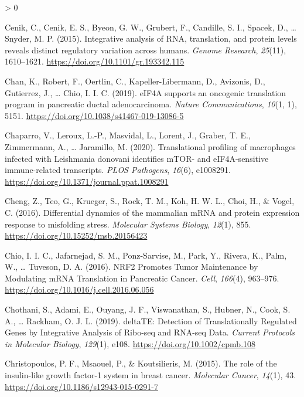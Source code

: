 \documentclass[
  12pt,
  openany]{book}
\newlength{\cslhangindent}
\newenvironment{CSLReferences}[2] %
 {%
  \setlength{\parindent}{0pt}
  \ifodd #1 \everypar{\setlength{\hangindent}{\cslhangindent}}\ignorespaces\fi
  \ifnum #2 > 0
  \setlength{\parskip}{#2\baselineskip}
  \fi
 }%
 {}
\begin{document}
\begin{CSLReferences}{1}{0}
\leavevmode\hypertarget{ref-Cenik2015}{}%
Cenik, C., Cenik, E. S., Byeon, G. W., Grubert, F., Candille, S. I., Spacek, D., \ldots{} Snyder, M. P. (2015). Integrative analysis of {RNA}, translation, and protein levels reveals distinct regulatory variation across humans. \emph{Genome Research}, \emph{25}(11), 1610--1621. \url{https://doi.org/10.1101/gr.193342.115}

\leavevmode\hypertarget{ref-Chan2019}{}%
Chan, K., Robert, F., Oertlin, C., Kapeller-Libermann, D., Avizonis, D., Gutierrez, J., \ldots{} Chio, I. I. C. (2019). {eIF4A} supports an oncogenic translation program in pancreatic ductal adenocarcinoma. \emph{Nature Communications}, \emph{10}(1, 1), 5151. \url{https://doi.org/10.1038/s41467-019-13086-5}

\leavevmode\hypertarget{ref-Chaparro2020}{}%
Chaparro, V., Leroux, L.-P., Masvidal, L., Lorent, J., Graber, T. E., Zimmermann, A., \ldots{} Jaramillo, M. (2020). Translational profiling of macrophages infected with {Leishmania} donovani identifies {mTOR}- and {eIF4A}-sensitive immune-related transcripts. \emph{PLOS Pathogens}, \emph{16}(6), e1008291. \url{https://doi.org/10.1371/journal.ppat.1008291}

\leavevmode\hypertarget{ref-Cheng2016}{}%
Cheng, Z., Teo, G., Krueger, S., Rock, T. M., Koh, H. W. L., Choi, H., \& Vogel, C. (2016). Differential dynamics of the mammalian {mRNA} and protein expression response to misfolding stress. \emph{Molecular Systems Biology}, \emph{12}(1), 855. \url{https://doi.org/10.15252/msb.20156423}

\leavevmode\hypertarget{ref-Chio2016}{}%
Chio, I. I. C., Jafarnejad, S. M., Ponz-Sarvise, M., Park, Y., Rivera, K., Palm, W., \ldots{} Tuveson, D. A. (2016). {NRF2 Promotes Tumor Maintenance} by {Modulating mRNA Translation} in {Pancreatic Cancer}. \emph{Cell}, \emph{166}(4), 963--976. \url{https://doi.org/10.1016/j.cell.2016.06.056}

\leavevmode\hypertarget{ref-Chothani2019}{}%
Chothani, S., Adami, E., Ouyang, J. F., Viswanathan, S., Hubner, N., Cook, S. A., \ldots{} Rackham, O. J. L. (2019). {deltaTE}: {Detection} of {Translationally Regulated Genes} by {Integrative Analysis} of {Ribo}-seq and {RNA}-seq {Data}. \emph{Current Protocols in Molecular Biology}, \emph{129}(1), e108. \url{https://doi.org/10.1002/cpmb.108}

\leavevmode\hypertarget{ref-Christopoulos2015}{}%
Christopoulos, P. F., Msaouel, P., \& Koutsilieris, M. (2015). The role of the insulin-like growth factor-1 system in breast cancer. \emph{Molecular Cancer}, \emph{14}(1), 43. \url{https://doi.org/10.1186/s12943-015-0291-7}


\end{CSLReferences}
\end{document}
